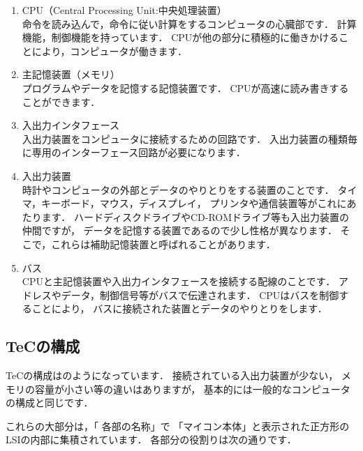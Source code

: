 \begin{enumerate}
\item CPU（Central Processing Unit:中央処理装置） \\
命令を読み込んで，命令に従い計算をするコンピュータの心臓部です．
計算機能，制御機能を持っています．
CPUが他の部分に積極的に働きかけることにより，コンピュータが働きます．
\item 主記憶装置（メモリ） \\
プログラムやデータを記憶する記憶装置です．
CPUが高速に読み書きすることができます．
\item 入出力インタフェース \\
入出力装置をコンピュータに接続するための回路です．
入出力装置の種類毎に専用のインターフェース回路が必要になります．
\item 入出力装置 \\
時計やコンピュータの外部とデータのやりとりをする装置のことです．
タイマ，キーボード，マウス，ディスプレイ，
プリンタや通信装置等がこれにあたります．
ハードディスクドライブやCD-ROMドライブ等も入出力装置の仲間ですが，
データを記憶する装置であるので少し性格が異なります．
そこで，これらは補助記憶装置と呼ばれることがあります．
\item バス \\
CPUと主記憶装置や入出力インタフェースを接続する配線のことです．
アドレスやデータ，制御信号等がバスで伝達されます．
CPUはバスを制御することにより，
バスに接続された装置とデータのやりとりをします．
\end{enumerate}

\newpage
\subsection{TeCの構成}

TeCの構成はのようになっています．
接続されている入出力装置が少ない，
メモリの容量が小さい等の違いはありますが，
基本的には一般的なコンピュータの構成と同じです．

これらの大部分は，「 各部の名称」で
「マイコン本体」と表示された正方形のLSIの内部に集積されています．
各部分の役割りは次の通りです．


